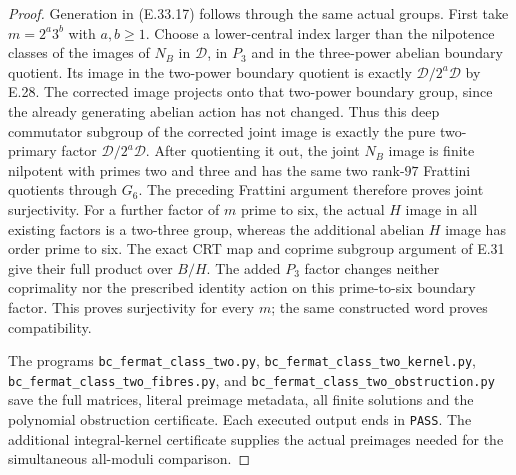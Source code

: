 \begin{proof}
Generation in \textup{(E.33.17)} follows through the
same actual groups.  First take $m=2^a3^b$ with
$a,b\ge1$.  Choose a lower-central index larger
than the nilpotence classes of the images of $N_B$
in $\mathscr D$, in $P_3$ and in the three-power
abelian boundary quotient.  Its image in the
two-power boundary quotient is exactly
$\mathcal D/2^a\mathcal D$ by E.28.
The corrected image projects onto that
two-power boundary group, since the already
generating abelian action has not changed.
Thus this deep commutator subgroup of the corrected
joint image is exactly the pure two-primary factor
$\mathcal D/2^a\mathcal D$.
After quotienting it out, the joint $N_B$ image is
finite nilpotent with primes two and three and
has the same two rank-$97$ Frattini quotients
through $G_6$.  The preceding Frattini argument
therefore proves joint surjectivity.
For a further factor of $m$ prime to six, the
actual $H$ image in all existing factors is a
two-three group, whereas the additional abelian
$H$ image has order prime to six.  The exact
CRT map and coprime subgroup argument of E.31
give their full product over $B/H$.
The added $P_3$ factor changes neither coprimality
nor the prescribed identity action on this
prime-to-six boundary factor.  This proves
surjectivity for every $m$; the same constructed
word proves compatibility.

The programs
\texttt{bc\_fermat\_class\_two.py},
\texttt{bc\_fermat\_class\_two\_kernel.py},
\texttt{bc\_fermat\_class\_two\_fibres.py}, and
\texttt{bc\_fermat\_class\_two\_obstruction.py}
save the full matrices, literal preimage metadata,
all finite solutions and the polynomial obstruction
certificate.  Each executed output ends in
\texttt{PASS}.  The additional integral-kernel
certificate supplies the actual preimages needed
for the simultaneous all-moduli comparison.
\end{proof}

